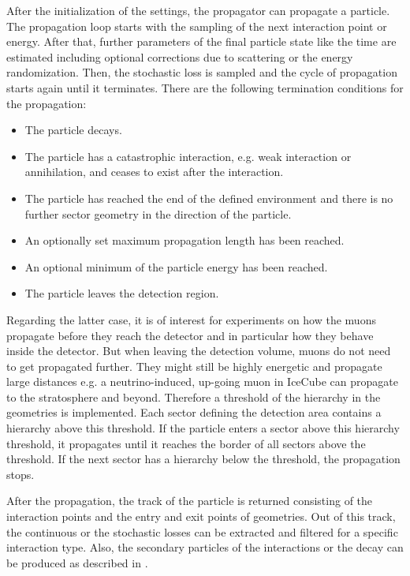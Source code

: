 After the initialization of the settings, the propagator can propagate a particle.
The propagation loop starts with the sampling of the next interaction point or energy.
After that, further parameters of the final particle state like the time are estimated including optional corrections due to scattering or the energy randomization.
Then, the stochastic loss is sampled and the cycle of propagation starts again until it terminates.
There are the following termination conditions for the propagation:
\begin{itemize}
    \item The particle decays.
    \item The particle has a catastrophic interaction, e.g. weak interaction or annihilation, and ceases to exist after the interaction.
    \item The particle has reached the end of the defined environment and there is no further sector geometry in the direction of the particle.
    \item An optionally set maximum propagation length has been reached.
    \item An optional minimum of the particle energy has been reached.
    \item The particle leaves the detection region.
\end{itemize}
Regarding the latter case, it is of interest for experiments on how the muons propagate before they reach the detector and in particular how they behave inside the detector.
But when leaving the detection volume, muons do not need to get propagated further.
They might still be highly energetic and propagate large distances e.g. a neutrino-induced, up-going muon in IceCube can propagate to the stratosphere and beyond.
Therefore a threshold of the hierarchy in the geometries is implemented.
Each sector defining the detection area contains a hierarchy above this threshold.
If the particle enters a sector above this hierarchy threshold, it propagates until it reaches the border of all sectors above the threshold.
If the next sector has a hierarchy below the threshold, the propagation stops.

After the propagation, the track of the particle is returned consisting of the interaction points and the entry and exit points of geometries.
Out of this track, the continuous or the stochastic losses can be extracted and filtered for a specific interaction type.
Also, the secondary particles of the interactions or the decay can be produced as described in .

